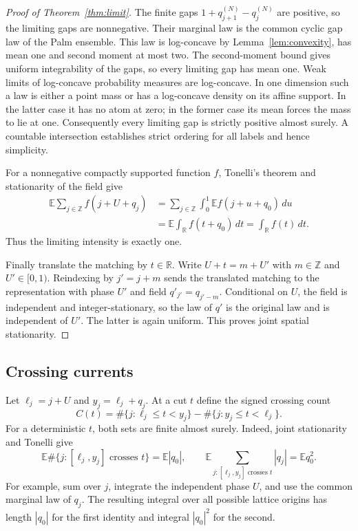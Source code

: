 \documentclass[11pt]{article}
\theoremstyle{remark}\newtheorem{remark}[theorem]{Remark}
\newcommand{\E}{\mathbb E}
\newcommand{\R}{\mathbb R}
\newcommand{\Z}{\mathbb Z}
\begin{document}
\begin{proof}[Proof of Theorem~\ref{thm:limit}]
The finite gaps $1+q_{j+1}^{(N)}-q_j^{(N)}$ are positive, so the
limiting gaps are nonnegative. Their marginal law is the common
cyclic gap law of the Palm ensemble. This law is log-concave by
Lemma~\ref{lem:convexity}, has mean one and second moment at most
two. The second-moment bound gives uniform integrability of the
gaps, so every limiting gap has mean one. Weak limits of log-concave
probability measures are log-concave. In one dimension such a law
is either a point mass or has a log-concave density on its affine
support. In the latter case it has no atom at zero; in the former
case its mean forces the mass to lie at one. Consequently every
limiting gap is strictly positive almost surely. A countable
intersection establishes strict ordering for all labels and hence
simplicity.

For a nonnegative compactly supported function $f$, Tonelli's theorem
and stationarity of the field give
\begin{align*}
 \E\sum_{j\in\Z}f(j+U+q_j)
 &=\sum_{j\in\Z}\int_0^1\E f(j+u+q_0)\,du\\
 &=\E\int_\R f(t+q_0)\,dt
 =\int_\R f(t)\,dt.
\end{align*}
Thus the limiting intensity is exactly one.

Finally translate the matching by $t\in\R$. Write
$U+t=m+U'$ with $m\in\Z$ and $U'\in[0,1)$. Reindexing by
$j'=j+m$ sends the translated matching to the representation with
phase $U'$ and field $q'_{j'}=q_{j'-m}$. Conditional on $U$, the
field is independent and integer-stationary, so the law of $q'$ is
the original law and is independent of $U'$. The latter is again
uniform. This proves joint spatial stationarity.
\end{proof}

\subsection{Crossing currents}

Let $\ell_j=j+U$ and $y_j=\ell_j+q_j$. At a cut $t$ define the
signed crossing count
\begin{equation}\label{eq:current}
 C(t)=\#\{j:\ell_j\le t<y_j\}
       -\#\{j:y_j\le t<\ell_j\}.
\end{equation}
For a deterministic $t$, both sets are finite almost surely. Indeed,
joint stationarity and Tonelli give
\begin{equation}\label{eq:crossing-expectations}
 \E\#\{j:[\ell_j,y_j]\text{ crosses }t\}=\E|q_0|,
 \qquad
 \E\sum_{j:[\ell_j,y_j]\text{ crosses }t}|q_j|=\E q_0^2.
\end{equation}
For example, sum over $j$, integrate the independent phase $U$,
and use the common marginal law of $q_j$. The resulting integral
over all possible lattice origins has length $|q_0|$ for the first
identity and integral $|q_0|^2$ for the second.
\end{document}
